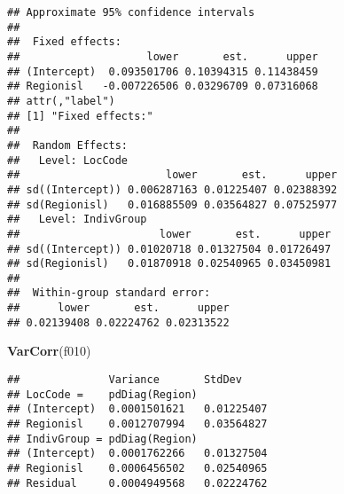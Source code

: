 \documentclass[]{article}
\newenvironment{Shaded}{\begin{snugshade}}{\end{snugshade}}
\newcommand{\KeywordTok}[1]{\textcolor[rgb]{0.13,0.29,0.53}{\textbf{#1}}}
\newcommand{\NormalTok}[1]{#1}
\begin{document}
\begin{verbatim}
## Approximate 95% confidence intervals
## 
##  Fixed effects:
##                    lower       est.      upper
## (Intercept)  0.093501706 0.10394315 0.11438459
## Regionisl   -0.007226506 0.03296709 0.07316068
## attr(,"label")
## [1] "Fixed effects:"
## 
##  Random Effects:
##   Level: LocCode 
##                       lower       est.      upper
## sd((Intercept)) 0.006287163 0.01225407 0.02388392
## sd(Regionisl)   0.016885509 0.03564827 0.07525977
##   Level: IndivGroup 
##                      lower       est.      upper
## sd((Intercept)) 0.01020718 0.01327504 0.01726497
## sd(Regionisl)   0.01870918 0.02540965 0.03450981
## 
##  Within-group standard error:
##      lower       est.      upper 
## 0.02139408 0.02224762 0.02313522
\end{verbatim}

\begin{Shaded}
\begin{Highlighting}[]
\KeywordTok{VarCorr}\NormalTok{(f010)}
\end{Highlighting}
\end{Shaded}

\begin{verbatim}
##              Variance       StdDev    
## LocCode =    pdDiag(Region)           
## (Intercept)  0.0001501621   0.01225407
## Regionisl    0.0012707994   0.03564827
## IndivGroup = pdDiag(Region)           
## (Intercept)  0.0001762266   0.01327504
## Regionisl    0.0006456502   0.02540965
## Residual     0.0004949568   0.02224762
\end{verbatim}
\end{document}
